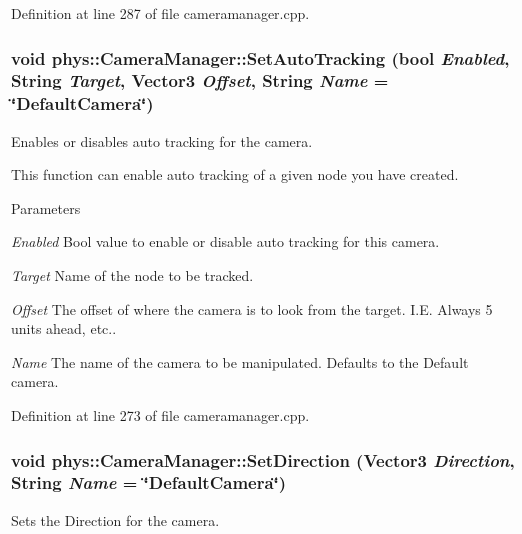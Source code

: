 Definition at line 287 of file cameramanager.cpp.

\hypertarget{classphys_1_1CameraManager_a43d55c71817096add5dad1552239fc74}{
\subsubsection[{SetAutoTracking}]{\setlength{\rightskip}{0pt plus 5cm}void phys::CameraManager::SetAutoTracking (bool {\em Enabled}, \/  {\bf String} {\em Target}, \/  {\bf Vector3} {\em Offset}, \/  {\bf String} {\em Name} = {\ttfamily \char`\"{}DefaultCamera\char`\"{}})}}
\label{d9/d91/classphys_1_1CameraManager_a43d55c71817096add5dad1552239fc74}


Enables or disables auto tracking for the camera. 

This function can enable auto tracking of a given node you have created. 
\begin{DoxyParams}{Parameters}
\item[{\em Enabled}]Bool value to enable or disable auto tracking for this camera. \item[{\em Target}]Name of the node to be tracked. \item[{\em Offset}]The offset of where the camera is to look from the target. I.E. Always 5 units ahead, etc.. \item[{\em Name}]The name of the camera to be manipulated. Defaults to the Default camera. \end{DoxyParams}


Definition at line 273 of file cameramanager.cpp.

\hypertarget{classphys_1_1CameraManager_aaee96e189230c020d6f7b6fe439e0812}{
\subsubsection[{SetDirection}]{\setlength{\rightskip}{0pt plus 5cm}void phys::CameraManager::SetDirection ({\bf Vector3} {\em Direction}, \/  {\bf String} {\em Name} = {\ttfamily \char`\"{}DefaultCamera\char`\"{}})}}
\label{d9/d91/classphys_1_1CameraManager_aaee96e189230c020d6f7b6fe439e0812}


Sets the Direction for the camera. 

